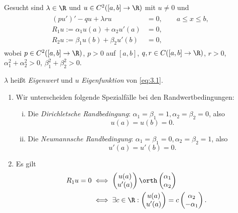 \begin{df} \label{3.6}
	Gesucht sind $\lambda \in \R$ und $u \in C^2([a,b]\to \R)$ mit $u \neq 0$ und
	\begin{align} \label{eq:3.1}
		\begin{aligned}
		(pu')' - qu + \lambda ru &= 0, \qquad a\le x \le b, \\
		R_1 u := \alpha_1 u(a) + \alpha_2 u'(a) &= 0, \\
		R_2 u := \beta_1 u(b) + \beta_2 u'(b) &= 0,
		\end{aligned}
	\end{align}
	wobei $p \in C^2([a,b] \to \R)$, $p > 0$ auf $[a,b]$, $q,r \in C([a,b] \to \R)$, $r>0$, $\alpha_1^2 + \alpha_2^2 > 0$, $\beta_1^2 + \beta_2^2 > 0$.

	$\lambda$ heißt \emph{Eigenwert} und $u$ \emph{Eigenfunktion} von \eqref{eq:3.1}.
\end{df}

\begin{nt} \label{3.7}
	\begin{enumerate}[1)]
		\item
			Wir unterscheiden folgende Spezialfälle bei den Randwertbedingungen:
			\begin{enumerate}[i)]
				\item
					Die \emph{Dirichletsche Randbedingung}: $\alpha_1 = \beta_1 = 1, \alpha_2 = \beta_2 = 0$, also
					\[
						u(a) = u(b) = 0.
					\]
				\item
					Die \emph{Neumannsche Randbedingung}: $\alpha_1 = \beta_1 = 0, \alpha_2 = \beta_2 = 1$, also
					\[
						u'(a) = u'(b) = 0.
					\]
			\end{enumerate}
		\item
			Es gilt
			\begin{align*}
				R_1 u = 0
				&\iff \begin{pmatrix}
					u(a) \\ u'(a) 
				\end{pmatrix} \orth \begin{pmatrix}
					\alpha_1 \\ \alpha_2
				\end{pmatrix} \\
				&\iff \exists c \in \R : \begin{pmatrix}
					u(a) \\ u'(a)
				\end{pmatrix} = c \begin{pmatrix}
					\alpha_2 \\ -\alpha_1
				\end{pmatrix}.
			\end{align*}


	\end{enumerate}
\end{nt}

